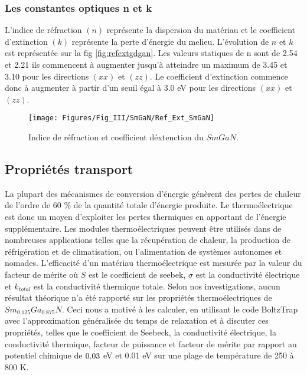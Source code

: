 \subsubsection{Les constantes optiques n et k}

L'indice de réfraction $(n)$ représente la dispersion du matériau et le coefficient d'extinction $ (k) $ représente la perte d'énergie du melieu. L'évolution de $ n $ et $ k $ est représentée sur la fig \ref{fig:refextgdgan}. Les valeurs statiques de n sont de 2.54 et 2.21 ils commencent à augmenter jusqu'à atteindre un maximum de 3.45 et 3.10 pour les directions $ (xx) $ et $ (zz) $. Le coefficient d'extinction commence donc à augmenter à partir d'un seuil égal à 3.0 eV pour les directions $ (xx) $ et $ (zz) $.

\begin{figure}[h!]
	\centering
	\texttt{[image: Figures/Fig\_III/SmGaN/Ref\_Ext\_SmGaN]}
	\caption{Indice de réfraction et coefficient déxtenction du $SmGaN$.}
	\label{fig:refextsmgan}
\end{figure}
\FloatBarrier

\subsection{Propriétés transport}

La plupart des mécanismes de conversion d'énergie génèrent des pertes de chaleur de l'ordre de 60 \% de la quantité totale d'énergie produite. Le thermoélectrique est donc un moyen d'exploiter les pertes thermiques en apportant de l'énergie supplémentaire. Les modules thermoélectriques peuvent être utilisés dans de nombreuses applications telles que la récupération de chaleur, la production de réfrigération et de climatisation, ou l'alimentation de systèmes autonomes et nomades. L'efficacité d'un matériau thermoélectrique est mesurée par la valeur du facteur de mérite où $ S $ est le coefficient de seebek, $ \sigma $ est la conductivité électrique et $ k_ {total} $ est la conductivité thermique totale. Selon nos investigations, aucun résultat théorique n'a été rapporté sur les propriétés thermoélectriques de $ Sm_ {0.125} Ga_{0.875}N $. Ceci nous a motivé à les calculer, en utilisant le code BoltzTrap avec l’approximation généralisée du temps de relaxation  et à discuter ces propriétés, telles que le coefficient de Seebeck, la conductivité électrique, la conductivité thermique, facteur de puissance et facteur de mérite par rapport au potentiel chimique de $ \-0.03 $ eV et 0.01 eV sur une plage de température de 250 à 800 K.

